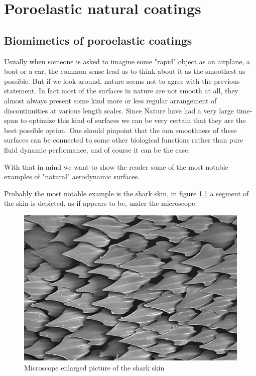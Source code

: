 \chapter{Poroelastic natural coatings}


\section{Biomimetics of poroelastic coatings}

Usually when someone is asked to imagine some "rapid" object as an airplane, a boat or a car, the common sense lead us to think about it as the smoothest as possible.
But if we look around, nature seems not to agree with the previous statement.
In fact most of the surfaces in nature are not smooth at all, they almost always present some kind more or less regular arrangement of discontinuities at various length scales.
Since Nature have had a very large time-span to optimize this kind of surfaces we can be very certain that they are the best possible option.
One should pinpoint that the non smoothness of these surfaces can be connected to some other biological functions rather than pure fluid dynamic performance, and of course it can be the case.

With that in mind we want to show the reader some of the most notable examples of "natural" aerodynamic surfaces.

Probably the most notable example is the shark skin, in figure \ref{fig:shark} a segment of the skin is depicted, as if appears to be, under the microscope.

\begin{figure}[h]
	\centering
	\includegraphics[width=0.6\linewidth]{chapter_1/shark}
	\caption{Microscope enlarged picture of the shark skin}
	\label{fig:shark}
\end{figure}

